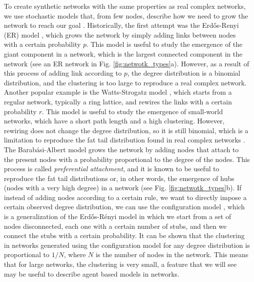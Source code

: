 To create synthetic networks with the same properties as real complex networks, we use stochastic models that, from few nodes, describe how we need to grow the network to reach our goal \cite{posfai2016network}. Historically, the first attempt was the Erd\H{o}s-Renyi (ER) model \cite{erdos1960evolution}, which grows the network by simply adding links between nodes with a certain probability $p$. This model is useful to study the emergence of the giant component in a network, which is the largest connected component in the network (see an ER network in Fig. \ref{fig:netwotk_types}a). However, as a result of this process of adding link according to $p$, the degree distribution is a binomial distribution, and the clustering is too large to reproduce a real complex network. Another popular example is the Watts-Strogatz model \cite{watts1998collective}, which starts from a regular network, typically a ring lattice, and rewires the links with a certain probability $r$. This model is useful to study the emergence of small-world networks, which have a short path length and a high clustering. However, rewiring does not change the degree distribution, so it is still binomial, which is a limitation to reproduce the fat tail distribution found in real complex networks \cite{newman2003structure}. The Barab\'asi-Albert model \cite{barabasi1999emergence} grows the network by adding nodes that attach to the present nodes with a probability proportional to the degree of the nodes. This process is called \textit{preferential attachment}, and it is known to be useful to reproduce the fat tail distributions \cite{merton1968matthew} or, in other words, the emergence of hubs (nodes with a very high degree) in a network (see Fig. \ref{fig:netwotk_types}b). If instead of adding nodes according to a certain rule, we want to directly impose a certain observed degree distribution, we can use the configuration model \cite{newman-book}, which is a generalization of the Erd\H{o}s-R\'enyi model in which we start from a set of nodes disconnected, each one with a certain number of stubs, and then we connect the stubs with a certain probability. It can be shown that the clustering in networks generated using the configuration model for any degree distribution is proportional to $1/N$, where $N$ is the number of nodes in the network. This means that for large networks, the clustering is very small, a feature that we will see may be useful to describe agent based models in networks.

